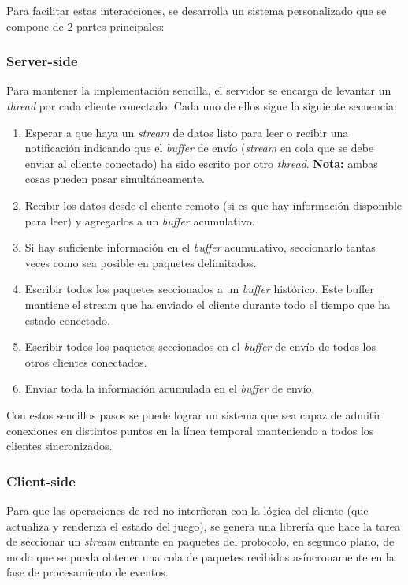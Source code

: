 Para facilitar estas interacciones, se desarrolla un sistema personalizado que se compone de 2 partes principales:

\subsubsection*{Server-side}
Para mantener la implementación sencilla, el servidor se encarga de levantar un \emph{thread} por cada cliente conectado. Cada uno de ellos sigue la siguiente secuencia:

\begin{enumerate}
	\item Esperar a que haya un \emph{stream} de datos listo para leer o recibir una notificación indicando que el \emph{buffer} de envío (\emph{stream} en cola que se debe enviar al cliente conectado) ha sido escrito por otro \emph{thread}. \textbf{Nota:} ambas cosas pueden pasar simultáneamente.
	\item Recibir los datos desde el cliente remoto (si es que hay información disponible para leer) y agregarlos a un \emph{buffer} acumulativo.
	\item Si hay suficiente información en el \emph{buffer} acumulativo, seccionarlo tantas veces como sea posible en paquetes delimitados.
	\item Escribir todos los paquetes seccionados a un \emph{buffer} histórico. Este buffer mantiene el stream que ha enviado el cliente durante todo el tiempo que ha estado conectado.
	\item Escribir todos los paquetes seccionados en el \emph{buffer} de envío de todos los otros clientes conectados.
	\item Enviar toda la información acumulada en el \emph{buffer} de envío.
\end{enumerate}


Con estos sencillos pasos se puede lograr un sistema que sea capaz de admitir conexiones en distintos puntos en la línea temporal manteniendo a todos los clientes sincronizados.

\subsubsection*{Client-side}

Para que las operaciones de red no interfieran con la lógica del cliente (que actualiza y renderiza el estado del juego), se genera una librería que hace la tarea de seccionar un \emph{stream} entrante en paquetes del protocolo, en segundo plano, de modo que se pueda obtener una cola de paquetes recibidos asíncronamente en la fase de procesamiento de eventos.
